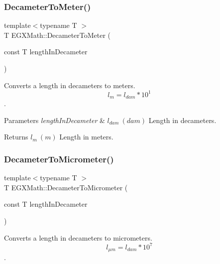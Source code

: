 \subsubsection{\texorpdfstring{Decameter\+To\+Meter()}{DecameterToMeter()}}
{\footnotesize\ttfamily template$<$typename T $>$ \\
T E\+G\+X\+Math\+::\+Decameter\+To\+Meter (\begin{DoxyParamCaption}\item[{const T}]{length\+In\+Decameter }\end{DoxyParamCaption})}



Converts a length in decameters to meters. \[ l_{m}=l_{dam} * 10^{1} \]. 


\begin{DoxyParams}{Parameters}
{\em length\+In\+Decameter} & $ l_{dam}\ (dam)$ Length in decameters. \\
\hline
\end{DoxyParams}
\begin{DoxyReturn}{Returns}
$ l_{m}\ (m)$ Length in meters. 
\end{DoxyReturn}
\mbox{\label{group___e_g_x_math-_conversions-_length_conversions-_s_i-_decameter-_s_i_gaa5b6d3a32a921345aa1ccb66a8df07c1}} 
\subsubsection{\texorpdfstring{Decameter\+To\+Micrometer()}{DecameterToMicrometer()}}
{\footnotesize\ttfamily template$<$typename T $>$ \\
T E\+G\+X\+Math\+::\+Decameter\+To\+Micrometer (\begin{DoxyParamCaption}\item[{const T}]{length\+In\+Decameter }\end{DoxyParamCaption})}



Converts a length in decameters to micrometers. \[ l_{\mu m}=l_{dam} * 10^{7} \]. 

